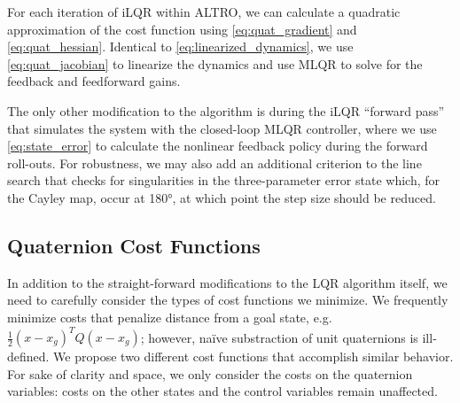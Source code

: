 \documentclass[letterpaper, 10 pt, conference]{ieeeconf}  %
\newcommand{\half}{\frac{1}{2}}
\begin{document}
        For each iteration of iLQR within ALTRO, we can calculate a quadratic
        approximation of the cost function using \eqref{eq:quat_gradient} and
        \eqref{eq:quat_hessian}. Identical to \eqref{eq:linearized_dynamics}, we use
        \eqref{eq:quat_jacobian} to linearize the dynamics and use MLQR to solve for the
        feedback and feedforward gains.
        
        The only other modification to the algorithm is during the iLQR ``forward pass''
        that simulates the system with the closed-loop MLQR controller, where we use
        \eqref{eq:state_error} to calculate the nonlinear feedback policy during the
        forward roll-outs.
        For robustness, we may also add an additional criterion to the line search that
        checks for singularities in the three-parameter error state which, for the Cayley
        map, occur at \ang{180}, at which point the step size should be reduced.
    
    \subsection{Quaternion Cost Functions} \label{sec:cost_functions}
        In addition to the straight-forward modifications to the LQR algorithm itself, we
        need to carefully consider the types of cost functions we minimize. We frequently
        minimize costs that penalize distance from a goal state, e.g. $\half (x-x_g)^T Q
        (x-x_g)$; however, na\"ive substraction of unit quaternions is ill-defined. We
        propose two different cost functions that accomplish similar behavior.
        For sake of clarity and space, we only consider the costs on the quaternion
        variables: costs on the other states and the control variables remain unaffected.
        
\end{document}
